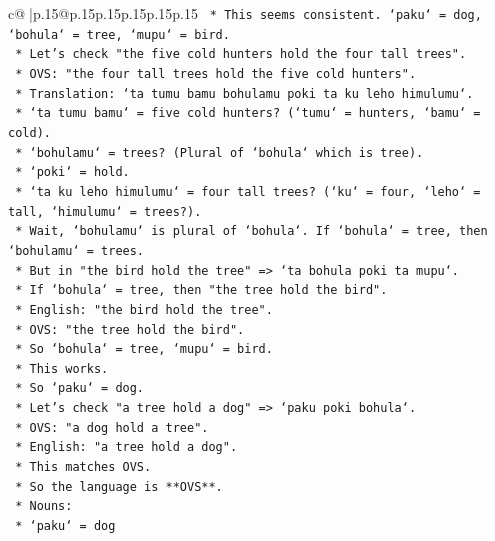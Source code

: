 \documentclass{article}
\begin{document}
{\begin{supertabular}{c@{$\;$}|p{.15\linewidth}@{}p{.15\linewidth}p{.15\linewidth}p{.15\linewidth}p{.15\linewidth}p{.15\linewidth}}
{{{\texttt{                *   This seems consistent. `paku` = dog, `bohula` = tree, `mupu` = bird.} \\
\texttt{                *   Let's check "the five cold hunters hold the four tall trees".} \\
\texttt{                *   OVS: "the four tall trees hold the five cold hunters".} \\
\texttt{                *   Translation: `ta tumu bamu bohulamu poki ta ku leho himulumu`.} \\
\texttt{                *   `ta tumu bamu` = five cold hunters? (`tumu` = hunters, `bamu` = cold).} \\
\texttt{                *   `bohulamu` = trees? (Plural of `bohula` which is tree).} \\
\texttt{                *   `poki` = hold.} \\
\texttt{                *   `ta ku leho himulumu` = four tall trees? (`ku` = four, `leho` = tall, `himulumu` = trees?).} \\
\texttt{                *   Wait, `bohulamu` is plural of `bohula`. If `bohula` = tree, then `bohulamu` = trees.} \\
\texttt{                *   But in "the bird hold the tree" => `ta bohula poki ta mupu`.} \\
\texttt{                *   If `bohula` = tree, then "the tree hold the bird".} \\
\texttt{                *   English: "the bird hold the tree".} \\
\texttt{                *   OVS: "the tree hold the bird".} \\
\texttt{                *   So `bohula` = tree, `mupu` = bird.} \\
\texttt{                *   This works.} \\
\texttt{                *   So `paku` = dog.} \\
\texttt{                *   Let's check "a tree hold a dog" => `paku poki bohula`.} \\
\texttt{                *   OVS: "a dog hold a tree".} \\
\texttt{                *   English: "a tree hold a dog".} \\
\texttt{                *   This matches OVS.} \\
\texttt{                *   So the language is **OVS**.} \\
\texttt{                *   Nouns:} \\
\texttt{                    *   `paku` = dog} \\
}}}
\end{supertabular}}
\end{document}
